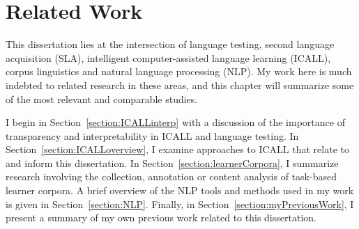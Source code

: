 \chapter{Related Work}
\label{chap:lit}

This dissertation lies at the intersection of language testing, second language acquisition (SLA), intelligent computer-assisted language learning (ICALL), corpus linguistics and natural language processing (NLP). My work here is much indebted to related research in these areas, and this chapter will summarize some of the most relevant and comparable studies.


I begin in Section~\ref{section:ICALLinterp} with a discussion of the importance of transparency and interpretability in ICALL and language testing. In  Section~\ref{section:ICALLoverview}, I examine approaches to ICALL that relate to and inform this dissertation. In Section~\ref{section:learnerCorpora}, I summarize research involving the collection, annotation or content analysis of task-based learner corpora. A brief overview of the NLP tools and methods used in my work is given in Section~\ref{section:NLP}. Finally, in Section~\ref{section:myPreviousWork}, I present a summary of my own previous work related to this dissertation. 

